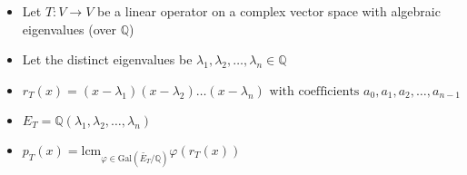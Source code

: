\documentclass[preview]{standalone}
\begin{document}
\begin{center}
\begin{itemize} \item Let $T : V \to V$ be a linear operator on a complex vector space with algebraic eigenvalues (over $\mathbb{Q}$) \item Let the distinct eigenvalues be $\lambda_1, \lambda_2, \ldots, \lambda_n \in \mathbb{Q}$ \item $r_T(x) = (x - \lambda_1)(x - \lambda_2) \ldots (x - \lambda_n) \text{ with coefficients } a_0, a_1, a_2, \dots, a_{n - 1}$ \item $E_T = \mathbb{Q}(\lambda_1, \lambda_2, \dots, \lambda_n)$ \item $\displaystyle p_T(x) = \text{lcm}_{\varphi \in \text{Gal}\left(\widetilde{E_T}/\mathbb{Q}\right)} \varphi(r_T(x))$ \end{itemize}
\end{center}
\end{document}
